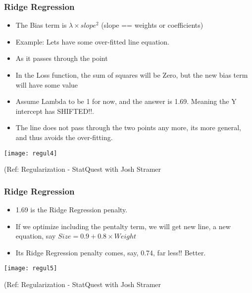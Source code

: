 \begin{frame}[fragile]\frametitle{Ridge Regression}
\begin{itemize}
\item The Bias term is $\lambda \times slope^2$ (slope == weights or coefficients)
\item Example: Lets have some over-fitted line equation. 
\item As it passes through the point
\item In the Loss function, the sum of squares will be Zero, but the new bias term will have some value
\item Assume Lambda to be 1 for now, and the answer is 1.69. Meaning the Y intercept has SHIFTED!!.
\item The line does not pass through the two points any more, its more general, and thus avoids the over-fitting.
\end{itemize}

\begin{center}
\texttt{[image: regul4]}
\end{center}

{\tiny (Ref: Regularization - StatQuest with Josh Stramer}
\end{frame}


\begin{frame}[fragile]\frametitle{Ridge Regression}
\begin{itemize}
\item 1.69 is the Ridge Regression penalty.
\item If we optimize including the pentalty term, we will get new line, a new equation, say
 $Size = 0.9 + 0.8 \times Weight$ 
\item Its Ridge Regression penalty comes, say, 0.74, far less!! Better.
\end{itemize}

\begin{center}
\texttt{[image: regul5]}
\end{center}

{\tiny (Ref: Regularization - StatQuest with Josh Stramer}
\end{frame}

